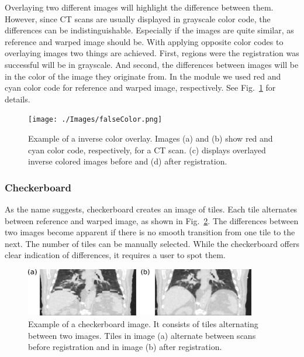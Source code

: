 \documentclass[type=dr, dr=rernat, accentcolor=tud7b,colorbacktitle, bigchapter, openright, twoside, 12pt ]{tudthesis}
\begin{document}
Overlaying two different images will highlight the difference between them. However, since CT scans are usually displayed in grayscale color code, the differences can be indistinguishable. Especially if the images are quite similar, as reference and warped image should be. With applying opposite color codes to overlaying images two things are achieved. First, regions were the registration was successful will be in grayscale. And second, the differences between images will be in the color of the image they originate from. In the module we used red and cyan color code for reference and warped image, respectively. See Fig.~\ref{falseColor} for details.

\newpage
\begin{figure}[H]
	\begin{center}		
		\texttt{[image: ./Images/falseColor.png]}
		\caption{Example of a inverse color overlay. Images (a) and (b) show red and cyan color code, respectively, for a CT scan. (c) displays overlayed inverse colored images before and (d) after registration.}
		\label{falseColor}
	\end{center}
\end{figure}

\subsubsection{Checkerboard}

As the name suggests, checkerboard creates an image of tiles. Each tile alternates between reference and warped image, as shown in Fig.~\ref{checkerboard}. The differences between two images become apparent if there is no smooth transition from one tile to the next. The number of tiles can be manually selected. While the checkerboard offers clear indication of differences, it requires a user to spot them.

\begin{figure}[H]
	\begin{center}		
		\includegraphics[width=0.9\textwidth]{./Images/checkerboard.png}
		\caption{Example of a checkerboard image. It consists of tiles alternating between two images. Tiles in image (a) alternate between scans before registration and in image (b) after registration.}
		\label{checkerboard}
	\end{center}
\end{figure}
\end{document}
